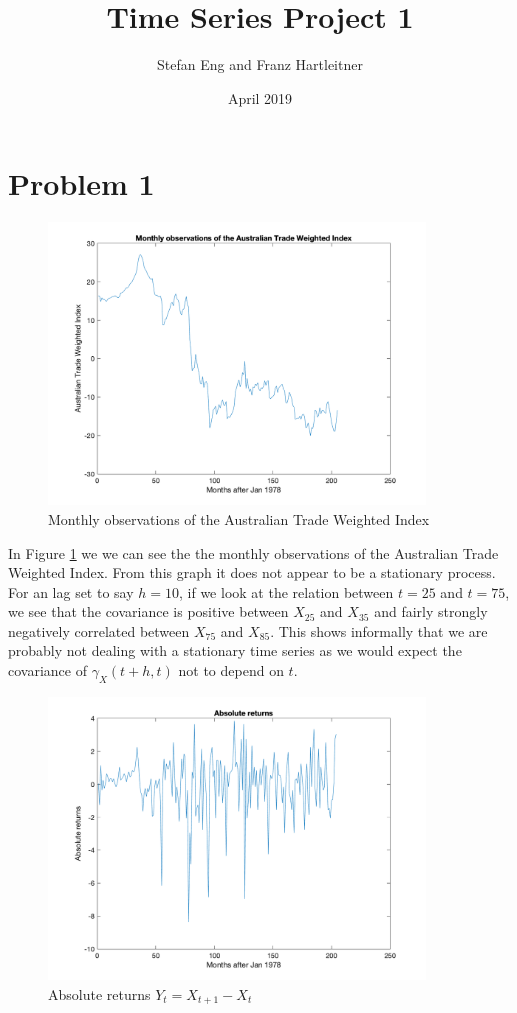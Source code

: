 \documentclass{article}
\title{Time Series Project 1}
\author{Stefan Eng and Franz Hartleitner}
\date{April 2019}
\begin{document}
\maketitle

\section*{Problem 1}

\begin{figure}[H]
\includegraphics[width=10cm]{plots/exchangedata.png}
\centering
\caption{Monthly observations of the Australian Trade Weighted Index}
\label{fig:exchangerate}
\end{figure}

In Figure \ref{fig:exchangerate} we we can see the the monthly observations of the Australian Trade Weighted Index.
From this graph it does not appear to be a stationary process.
For an lag set to say $h = 10$, if we look at the relation between $t = 25$ and $t = 75$, we see that the covariance is positive between $X_{25}$ and $X_{35}$ and fairly strongly negatively correlated between $X_{75}$ and $X_{85}$.
This shows informally that we are probably not dealing with a stationary time series as we would expect the covariance of $\gamma_{X}(t + h, t)$ not to depend on $t$.

\begin{figure}[H]
\includegraphics[width=10cm]{plots/abs_returns.png}
\centering
\caption{Absolute returns $Y_t = X_{t + 1} - X_{t}$}
\label{fig:absreturns}
\end{figure}
\end{document}
